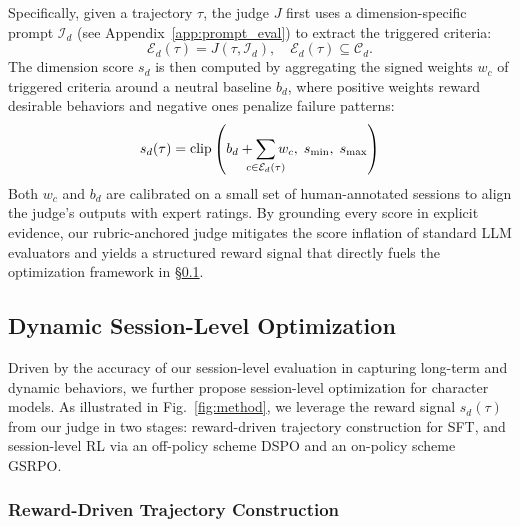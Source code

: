 Specifically, given a trajectory $\tau$, the judge $J$ first uses a dimension-specific prompt $\mathcal{I}_d$ (see Appendix~\ref{app:prompt_eval}) to extract the triggered criteria:
\begin{equation}
\mathcal{E}_d(\tau) = J(\tau, \mathcal{I}_d), \quad \mathcal{E}_d(\tau) \subseteq \mathcal{C}_d.
\end{equation}
The dimension score $s_d$ is then computed by aggregating the signed weights $w_c$ of triggered criteria around a neutral baseline $b_d$, where positive weights reward desirable behaviors and negative ones penalize failure patterns:
\begin{equation}
s_d(\tau) = \mathrm{clip}\left( b_d + \sum_{\mathclap{c \in \mathcal{E}_d(\tau)}} w_c, \; s_{\min}, \; s_{\max} \right)
\label{eq:score}
\end{equation}
Both $w_c$ and $b_d$ are calibrated on a small set of human-annotated sessions to align the judge's outputs with expert ratings.
 By grounding every score in explicit evidence, our rubric-anchored judge mitigates the score inflation of standard LLM evaluators and yields a structured reward signal that directly fuels the optimization framework in §\ref{sec:train}.

\subsection{Dynamic Session-Level Optimization}
\label{sec:train}

Driven by the accuracy of our session-level evaluation in capturing long-term and dynamic behaviors, we further propose session-level optimization for character models.  As illustrated in Fig.~\ref{fig:method}, we leverage the reward signal $s_d(\tau)$ from our judge in two stages: reward-driven trajectory construction for SFT, and session-level RL via an off-policy scheme DSPO  and an on-policy scheme GSRPO.


\subsubsection{Reward-Driven Trajectory Construction}
\label{sec:stage1}

